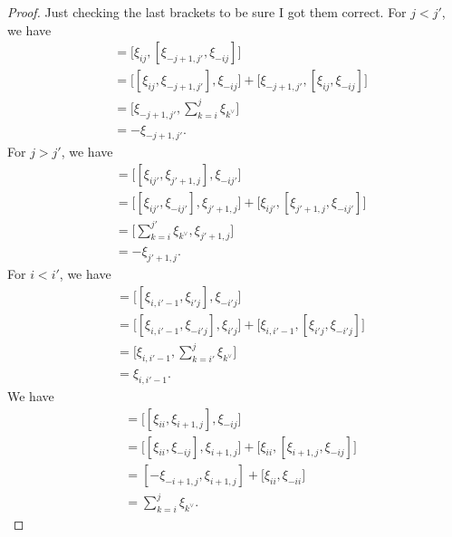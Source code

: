\documentclass[a4paper]{amsart}
\theoremstyle{definition}
\begin{document}
\begin{proof}
  Just checking the last brackets to be sure I got them correct.
  For $j<j'$, we have
  \begin{align*}
    [\xi_{ij},\xi_{-ij'}]
    &=\big[\xi_{ij},[\xi_{-j+1,j'},\xi_{-ij}]\big]\\
    &=\big[[\xi_{ij},\xi_{-j+1,j'}],\xi_{-ij}\big] + \big[\xi_{-j+1,j'},[\xi_{ij},\xi_{-ij}]\big]\\
    &=\big[\xi_{-j+1,j'},\sum\limits_{k=i}^j \xi_{k^\vee}\big]\\
    &=-\xi_{-j+1,j'}.
  \end{align*}
  For $j>j'$, we have
  \begin{align*}
    [\xi_{ij},\xi_{-ij'}]
    &=\big[ [\xi_{ij'},\xi_{j'+1,j}] , \xi_{-ij'} \big]\\
    &=\big[ [\xi_{ij'},\xi_{-ij'}] , \xi_{j'+1,j} \big] + \big[ \xi_{ij'} , [\xi_{j'+1,j},\xi_{-ij'}] \big]\\
    &=\big[\sum\limits_{k=i}^{j'} \xi_{k^\vee} , \xi_{j'+1,j}\big]\\
    &=-\xi_{j'+1,j}.
  \end{align*}
  For $i<i'$, we have
  \begin{align*}
    [\xi_{ij},\xi_{-i'j}]
    &=\big[ [\xi_{i,i'-1},\xi_{i'j}] , \xi_{-i'j}\big]\\
    &=\big[ [\xi_{i,i'-1},\xi_{-i'j}] , \xi_{i'j} \big] + \big[ \xi_{i,i'-1} , [\xi_{i'j} , \xi_{-i'j}]\big]\\
    &=\big[\xi_{i,i'-1},\sum\limits_{k=i'}^j \xi_{k^\vee}\big]\\
    &=\xi_{i,i'-1}.
  \end{align*}
  We have 
  \begin{align*}
    [\xi_{ij},\xi_{-ij}]
    &=\big[ [\xi_{ii},\xi_{i+1,j}] , \xi_{-ij}\big]\\
    &=\big[ [\xi_{ii},\xi_{-ij}] , \xi_{i+1,j}\big] + \big[ \xi_{ii} , [\xi_{i+1,j},\xi_{-ij}] \big]\\
    &=[ -\xi_{-i+1,j} , \xi_{i+1,j}] + \big[ \xi_{ii} , \xi_{-ii} \big]\\
    &=\sum\limits_{k=i}^j \xi_{k^\vee}.
  \end{align*}
\end{proof}
\end{document}
